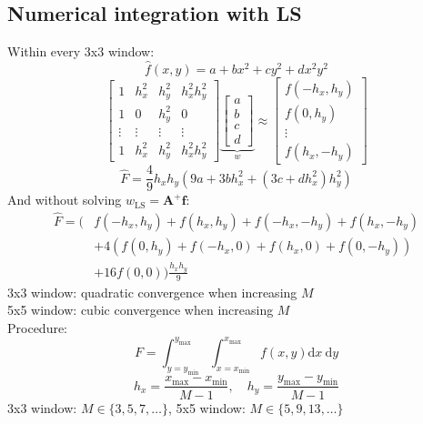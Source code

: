 \documentclass[english]{latex4ei/latex4ei_sheet}
\begin{document}
\begin{sectionbox}
  \subsection{Numerical integration with LS}
  Within every 3x3 window:
  $$\hat{f}(x, y)=a+b x^{2}+c y^{2}+d x^{2} y^{2}$$
  $$\left[\begin{array}{cccc}
    1 & h_{x}^{2} & h_{y}^{2} & h_{x}^{2} h_{y}^{2} \\
    1 & 0 & h_{y}^{2} & 0 \\
    \vdots & \vdots&\vdots&\vdots\\
    1 & h_{x}^{2} & h_{y}^{2} & h_{x}^{2} h_{y}^{2}
    \end{array}\right] \underbrace{\left[\begin{array}{c}
    a \\
    b \\
    c \\
    d
    \end{array}\right]}_{w} \approx\left[\begin{array}{c}
    f\left(-h_{x}, h_{y}\right) \\
    f\left(0, h_{y}\right) \\
    \vdots\\
    f\left(h_{x},-h_{y}\right)
    \end{array}\right]$$
    $$\hat{F}=\frac{4}{9} h_{x} h_{y}\left(9 a+3 b h_{x}^{2}+\left(3 c+d h_{x}^{2}\right) h_{y}^{2}\right)$$
    And without solving $w_{\mathrm{LS}}=\boldsymbol{A}^{+} \boldsymbol{f}$:
  $$\begin{aligned}
    \hat{F}=(& f\left(-h_{x}, h_{y}\right)+f\left(h_{x}, h_{y}\right)+f\left(-h_{x},-h_{y}\right)+f\left(h_{x},-h_{y}\right) \\
    &+4\left(f\left(0, h_{y}\right)+f\left(-h_{x}, 0\right)+f\left(h_{x}, 0\right)+f\left(0,-h_{y}\right)\right) \\
    &+16 f(0,0)) \frac{h_{x} h_{y}}{9}
    \end{aligned}$$
  3x3 window: quadratic convergence when increasing $M$\\
  5x5 window: cubic convergence when increasing $M$\\
  
  Procedure:\\
  $$F=\int_{y=y_{\min }}^{y_{\max }} \int_{x=x_{\min }}^{x_{\max }} f(x, y) \mathrm{d} x \mathrm{~d} y$$
  $$h_{x}=\frac{x_{\max }-x_{\min }}{M-1}, \quad h_{y}=\frac{y_{\max }-y_{\min }}{M-1}$$
  3x3 window: $ M \in\{3,5,7, \ldots\}$, 5x5 window: $M \in \{5,9,13, \ldots\}$\\
  

\end{sectionbox}
\end{document}
